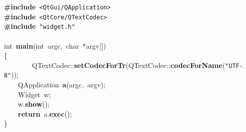 \noindent
\mbox{}\textbf{\#include}\ \texttt{\textless{}QtGui/QApplication\textgreater{}} \\
\mbox{}\textbf{\#include}\ \texttt{\textless{}QtCore/QTextCodec\textgreater{}} \\
\mbox{}\textbf{\#include}\ \texttt{"{}widget.h"{}} \\
\mbox{} \\
\mbox{}int\ \textbf{main}(int\ argc,\ char\ *argv[]) \\
\mbox{}\{ \\
\mbox{}\ \ \ \ \ \ \ \ QTextCodec::\textbf{setCodecForTr}(QTextCodec::\textbf{codecForName}(\texttt{"{}UTF-8"{}})); \\
\mbox{}\ \ \ \ QApplication\ \textbf{a}(argc,\ argv); \\
\mbox{}\ \ \ \ Widget\ w; \\
\mbox{}\ \ \ \ w.\textbf{show}(); \\
\mbox{}\ \ \ \ \textbf{return}\ a.\textbf{exec}(); \\
\mbox{}\} \\
\mbox{}
